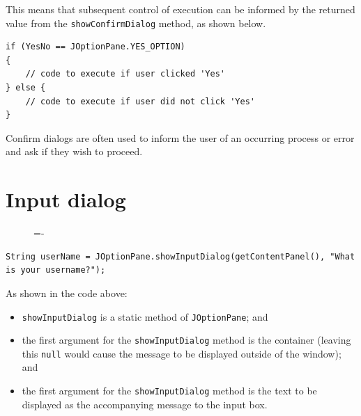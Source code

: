 \documentclass[a4paper]{systems-software}
\begin{document}
This means that subsequent control of execution can be informed by the returned value from the \texttt{showConfirmDialog} method, as shown below.

\begin{lstlisting}[title={Using return value from showConfirmDialog.}]
if (YesNo == JOptionPane.YES_OPTION)
{
	// code to execute if user clicked 'Yes'
} else {
	// code to execute if user did not click 'Yes'
}
\end{lstlisting}

Confirm dialogs are often used to inform the user of an occurring process or error and ask if they wish to proceed.


\section*{Input dialog}

\begin{figure}[H]
	\lineskip=-\fboxrule
\end{figure}

\begin{lstlisting}[title={Creating an input dialog.}]
String userName = JOptionPane.showInputDialog(getContentPanel(), "What is your username?");
\end{lstlisting}

As shown in the code above:
\begin{itemize}
	\item \texttt{showInputDialog} is a static method of \texttt{JOptionPane}; and
	\item the first argument for the \texttt{showInputDialog} method is the container (leaving this \texttt{null} would cause the message to be displayed outside of the window); and
	\item the first argument for the \texttt{showInputDialog} method is the text to be displayed as the accompanying message to the input box.
\end{itemize}
\end{document}
